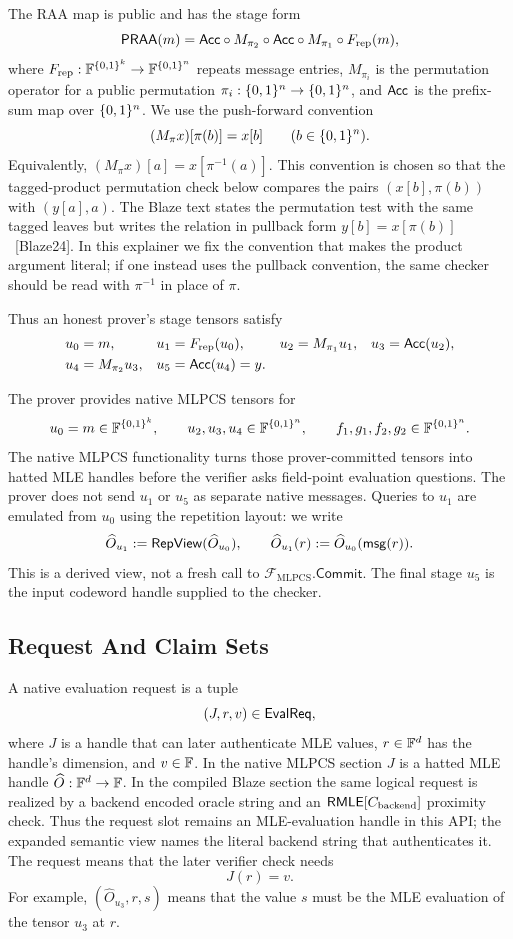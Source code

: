 The RAA map is public and has the stage form
\[
  \mathsf{PRAA}(m)
  =
  \mathsf{Acc}\circ M_{\pi_2}\circ\mathsf{Acc}\circ M_{\pi_1}\circ F_{\mathrm{rep}}(m),
\]
where \(F_{\mathrm{rep}}:\mathbb{F}^{\{0,1\}^k}\to\mathbb{F}^{\{0,1\}^n}\) repeats message entries,
\(M_{\pi_i}\) is the permutation operator for a public permutation
\(\pi_i:\{0,1\}^n\to\{0,1\}^n\), and \(\mathsf{Acc}\) is the prefix-sum map over
\(\{0,1\}^n\).  We use the push-forward convention
\[
  (M_\pi x)[\pi(b)]=x[b]
  \qquad(b\in\{0,1\}^n).
\]
Equivalently, \((M_\pi x)[a]=x[\pi^{-1}(a)]\).  This convention is chosen so
that the tagged-product permutation check below compares the pairs
\((x[b],\pi(b))\) with \((y[a],a)\).  The Blaze text states the permutation
test with the same tagged leaves but writes the relation in pullback form
\(y[b]=x[\pi(b)]\)~[Blaze24].  In this explainer we fix the convention that
makes the product argument literal; if one instead uses the pullback
convention, the same checker should be read with \(\pi^{-1}\) in place of
\(\pi\).

Thus an honest prover's stage tensors satisfy
\[
  \begin{aligned}
  u_0&=m,&
  u_1&=F_{\mathrm{rep}}(u_0),&
  u_2&=M_{\pi_1}u_1,&
  u_3&=\mathsf{Acc}(u_2),\\
  u_4&=M_{\pi_2}u_3,&
  u_5&=\mathsf{Acc}(u_4)=y.
  \end{aligned}
\]

The prover provides native MLPCS tensors for
\[
  u_0=m\in\mathbb{F}^{\{0,1\}^k},
  \qquad
  u_2,u_3,u_4\in\mathbb{F}^{\{0,1\}^n},
  \qquad
  f_1,g_1,f_2,g_2\in\mathbb{F}^{\{0,1\}^n}.
\]
The native MLPCS functionality turns those prover-committed tensors into
hatted MLE handles before the verifier asks field-point evaluation questions.
The prover does not send \(u_1\) or \(u_5\) as separate native messages.
Queries to \(u_1\) are emulated from \(u_0\) using the repetition layout:
we write
\[
  \widehat O_{u_1}:=\mathsf{RepView}(\widehat O_{u_0}),
  \qquad
  \widehat O_{u_1}(r):=\widehat O_{u_0}(\mathsf{msg}(r)).
\]
This is a derived view, not a fresh call to
\(\mathcal F_{\mathrm{MLPCS}}.\mathsf{Commit}\).  The final stage \(u_5\) is
the input codeword handle supplied to the checker.

\subsection{Request And Claim Sets}

A native evaluation request is a tuple
\[
  (J,r,v)\in\mathsf{EvalReq},
\]
where \(J\) is a handle that can later authenticate MLE values, \(r\in\mathbb{F}^d\)
has the handle's dimension, and \(v\in\mathbb{F}\).  In the native MLPCS section \(J\)
is a hatted MLE handle \(\widehat O:\mathbb{F}^d\to\mathbb{F}\).  In the compiled Blaze
section the same logical request is realized by a backend encoded oracle string
and an \(\mathsf{RMLE}[C_{\mathrm{backend}}]\) proximity check.  Thus the request slot
remains an MLE-evaluation handle in this API; the expanded semantic view names
the literal backend string that authenticates it.  The request means that the
later verifier check needs
\[
  J(r)=v.
\]
For example, \((\widehat O_{u_3},r,s)\) means that the value \(s\) must be the
MLE evaluation of the tensor \(u_3\) at \(r\).

